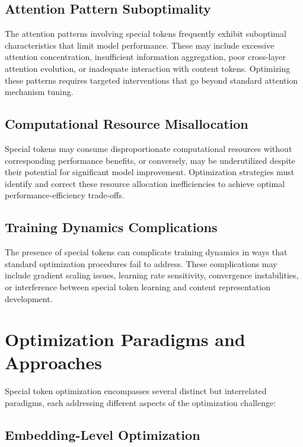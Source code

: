\subsection{Attention Pattern Suboptimality}

The attention patterns involving special tokens frequently exhibit suboptimal characteristics that limit model performance. These may include excessive attention concentration, insufficient information aggregation, poor cross-layer attention evolution, or inadequate interaction with content tokens. Optimizing these patterns requires targeted interventions that go beyond standard attention mechanism tuning.

\subsection{Computational Resource Misallocation}

Special tokens may consume disproportionate computational resources without corresponding performance benefits, or conversely, may be underutilized despite their potential for significant model improvement. Optimization strategies must identify and correct these resource allocation inefficiencies to achieve optimal performance-efficiency trade-offs.

\subsection{Training Dynamics Complications}

The presence of special tokens can complicate training dynamics in ways that standard optimization procedures fail to address. These complications may include gradient scaling issues, learning rate sensitivity, convergence instabilities, or interference between special token learning and content representation development.

\section{Optimization Paradigms and Approaches}

Special token optimization encompasses several distinct but interrelated paradigms, each addressing different aspects of the optimization challenge:

\subsection{Embedding-Level Optimization}

